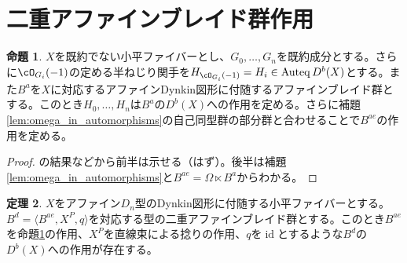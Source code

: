 \documentclass[uplatex, a4paper, dvipdfmx]{jsarticle}
\theoremstyle{definition}
\newtheorem{theorem}{定理}[section]
\newtheorem{proposition}[theorem]{命題}
\DeclareMathOperator{\Auteq}{\mathrm{Auteq}}
\DeclareMathOperator{\id}{\mathrm{id}}
\begin{document}
\section{二重アファインブレイド群作用}

\begin{proposition}\label{prop:action-of-affine-braid-group}
    $X$を既約でない小平ファイバーとし、$G_0, \dots, G_n$を既約成分とする。さらに$\cO_{G_i}(-1)$の定める半ねじり関手を$H_{\cO_{G_i}(-1)} = H_i \in \Auteq D^b(X)$とする。また$B^a$を$X$に対応するアファインDynkin図形に付随するアファインブレイド群とする。このとき$H_0, \dots, H_n$は$B^a$の$D^b(X)$への作用を定める。さらに補題\ref{lem:omega_in_automorphisms}の自己同型群の部分群と合わせることで$B^{ae}$の作用を定める。
\end{proposition}
\begin{proof}
    \cite{MR1831820, brav2010braid,nordskova2020faithful}の結果などから前半は示せる（はず）。後半は補題\ref{lem:omega_in_automorphisms}と$B^{ae} = \Omega \ltimes B^a$からわかる。
\end{proof}
\begin{theorem}
    $X$をアファイン$D_n$型のDynkin図形に付随する小平ファイバーとする。$B^d = \langle B^{ae}, X^P, q\rangle$を対応する型の二重アファインブレイド群とする。このとき$B^{ae}$を命題\ref{prop:action-of-affine-braid-group}の作用、$X^P$を直線束による捻りの作用、$q$を$\id$とするような$B^d$の$D^b(X)$への作用が存在する。
\end{theorem}
\end{document}
